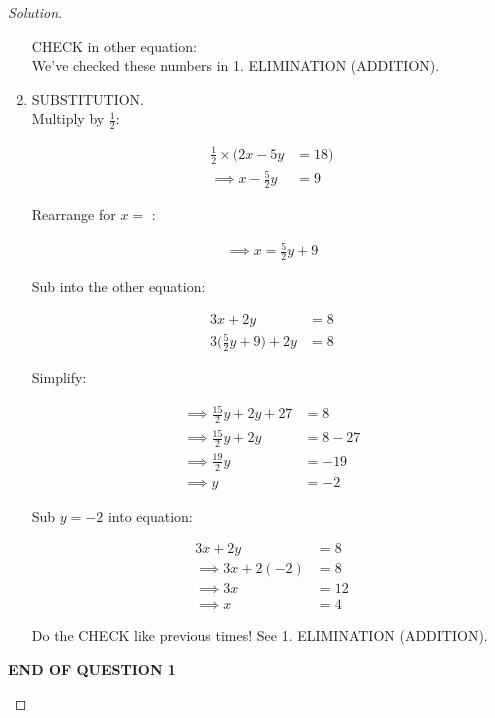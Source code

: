 \documentclass[12pt]{article}
\newenvironment{solution}{\begin{proof}[Solution]}{\end{proof}}
\begin{document}
\begin{solution}
\begin{enumerate}
    CHECK in other equation: \\
    We've checked these numbers in 1. ELIMINATION (ADDITION).
\clearpage

    \item SUBSTITUTION. \\
        Multiply by $\frac{1}{2}$:
        
        \begin{align*}
            \frac{1}{2} \times (2x - 5y &= 18) \\
            \implies  x - \frac{5}{2}y &= 9
        \end{align*}
        
        Rearrange for $x =$ :
        
        \begin{align*}
            \implies x = \frac{5}{2}y + 9
        \end{align*}
        
        Sub into the other equation:
        
        \begin{align*}
            3x + 2y &= 8 \\
            3\bigg(\frac{5}{2}y + 9\bigg) + 2y &= 8
        \end{align*}
        
        Simplify:
        
        \begin{align*}
            \implies \frac{15}{2}y +2y +27 &=  8 \\
            \implies \frac{15}{2}y +2y &= 8 - 27 \\
            \implies \frac{19}{2}y &= -19 \\
            \implies y &= -2
        \end{align*}
        
        Sub $y = -2$ into equation:
        
        \begin{align*}
         3x + 2y &= 8 \\
         \implies  3x + 2(-2) &= 8 \\
         \implies 3x &= 12 \\
         \implies x &= 4
        \end{align*}
        
        Do the CHECK like previous times! See 1. ELIMINATION (ADDITION).
\end{enumerate}

\begin{center}
    \bf END OF QUESTION 1
\end{center}

\end{solution}
 
\end{document}
